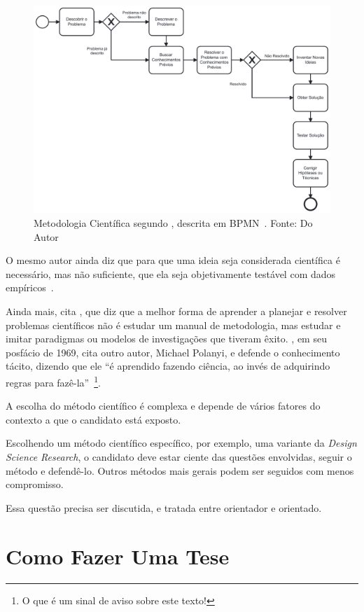 \begin{figure}[hbt]
    \centering
	\includegraphics[width=0.7\linewidth]{Images/metodologiabunge.pdf}
    \caption{Metodologia Científica segundo \citet{Bunge2002}, descrita em BPMN~\citep{omg2013bpmn}. Fonte: Do Autor}
    \label{fig:bunge}
\end{figure}

O mesmo autor ainda diz que para que uma ideia seja considerada científica é necessário, mas não suficiente, que ela seja objetivamente testável com dados empíricos~\citep[p. 37]{Bunge2002}. 

Ainda mais, \citet[p. 40]{Bunge2002} cita \citet{Kuhn1970}, que diz que a melhor forma de aprender a planejar e resolver problemas científicos não é estudar um manual de metodologia, mas estudar e imitar paradigmas ou modelos de investigações que tiveram êxito. \citet{Kuhn2018}, em seu posfácio de 1969, cita outro autor, Michael Polanyi,  e defende o conhecimento tácito,  dizendo que ele ``é aprendido fazendo ciência, ao invés de adquirindo regras para fazê-la''~\citep[p. 160]{Kuhn2018}\footnote{O que é um sinal de aviso sobre este texto!}.

A escolha do método científico é complexa e depende de vários fatores do contexto a que o candidato está exposto. 

Escolhendo um método científico específico, por exemplo, uma variante da\textit{ Design Science Research}\citep{hevner2004design,Pimentel2019}, o candidato deve estar ciente das questões envolvidas, seguir o método e defendê-lo. Outros métodos mais gerais podem ser seguidos com menos compromisso.

Essa questão precisa ser discutida, e tratada entre orientador e orientado.

\section{Como Fazer Uma Tese}

